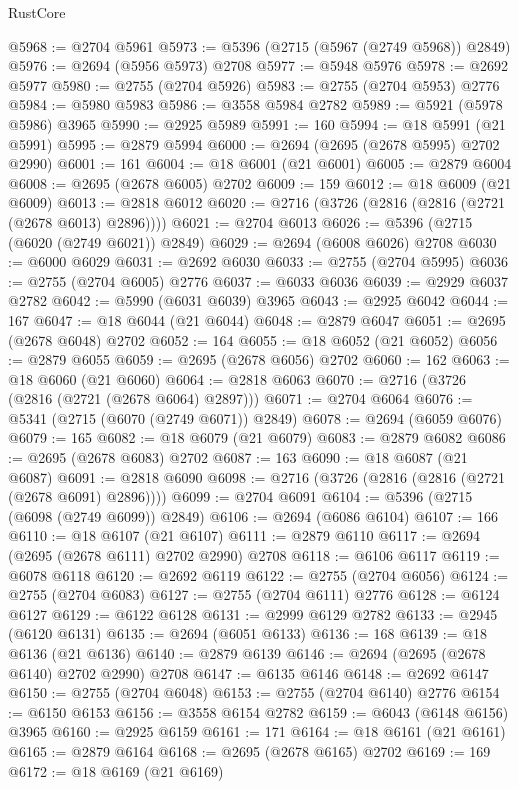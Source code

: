 \begin{lexlean}{RustCore}
\begin{coremodule}
@5968 := @2704 @5961
@5973 := @5396 (@2715 (@5967 (@2749 @5968)) @2849)
@5976 := @2694 (@5956 @5973) @2708
@5977 := @5948 @5976
@5978 := @2692 @5977
@5980 := @2755 (@2704 @5926)
@5983 := @2755 (@2704 @5953) @2776
@5984 := @5980 @5983
@5986 := @3558 @5984 @2782
@5989 := @5921 (@5978 @5986) @3965
@5990 := @2925 @5989
@5991 := 160
@5994 := @18 @5991 (@21 @5991)
@5995 := @2879 @5994
@6000 := @2694 (@2695 (@2678 @5995) @2702 @2990)
@6001 := 161
@6004 := @18 @6001 (@21 @6001)
@6005 := @2879 @6004
@6008 := @2695 (@2678 @6005) @2702
@6009 := 159
@6012 := @18 @6009 (@21 @6009)
@6013 := @2818 @6012
@6020 := @2716 (@3726 (@2816 (@2816 (@2721 (@2678 @6013) @2896))))
@6021 := @2704 @6013
@6026 := @5396 (@2715 (@6020 (@2749 @6021)) @2849)
@6029 := @2694 (@6008 @6026) @2708
@6030 := @6000 @6029
@6031 := @2692 @6030
@6033 := @2755 (@2704 @5995)
@6036 := @2755 (@2704 @6005) @2776
@6037 := @6033 @6036
@6039 := @2929 @6037 @2782
@6042 := @5990 (@6031 @6039) @3965
@6043 := @2925 @6042
@6044 := 167
@6047 := @18 @6044 (@21 @6044)
@6048 := @2879 @6047
@6051 := @2695 (@2678 @6048) @2702
@6052 := 164
@6055 := @18 @6052 (@21 @6052)
@6056 := @2879 @6055
@6059 := @2695 (@2678 @6056) @2702
@6060 := 162
@6063 := @18 @6060 (@21 @6060)
@6064 := @2818 @6063
@6070 := @2716 (@3726 (@2816 (@2721 (@2678 @6064) @2897)))
@6071 := @2704 @6064
@6076 := @5341 (@2715 (@6070 (@2749 @6071)) @2849)
@6078 := @2694 (@6059 @6076)
@6079 := 165
@6082 := @18 @6079 (@21 @6079)
@6083 := @2879 @6082
@6086 := @2695 (@2678 @6083) @2702
@6087 := 163
@6090 := @18 @6087 (@21 @6087)
@6091 := @2818 @6090
@6098 := @2716 (@3726 (@2816 (@2816 (@2721 (@2678 @6091) @2896))))
@6099 := @2704 @6091
@6104 := @5396 (@2715 (@6098 (@2749 @6099)) @2849)
@6106 := @2694 (@6086 @6104)
@6107 := 166
@6110 := @18 @6107 (@21 @6107)
@6111 := @2879 @6110
@6117 := @2694 (@2695 (@2678 @6111) @2702 @2990) @2708
@6118 := @6106 @6117
@6119 := @6078 @6118
@6120 := @2692 @6119
@6122 := @2755 (@2704 @6056)
@6124 := @2755 (@2704 @6083)
@6127 := @2755 (@2704 @6111) @2776
@6128 := @6124 @6127
@6129 := @6122 @6128
@6131 := @2999 @6129 @2782
@6133 := @2945 (@6120 @6131)
@6135 := @2694 (@6051 @6133)
@6136 := 168
@6139 := @18 @6136 (@21 @6136)
@6140 := @2879 @6139
@6146 := @2694 (@2695 (@2678 @6140) @2702 @2990) @2708
@6147 := @6135 @6146
@6148 := @2692 @6147
@6150 := @2755 (@2704 @6048)
@6153 := @2755 (@2704 @6140) @2776
@6154 := @6150 @6153
@6156 := @3558 @6154 @2782
@6159 := @6043 (@6148 @6156) @3965
@6160 := @2925 @6159
@6161 := 171
@6164 := @18 @6161 (@21 @6161)
@6165 := @2879 @6164
@6168 := @2695 (@2678 @6165) @2702
@6169 := 169
@6172 := @18 @6169 (@21 @6169)

\end{coremodule}
\end{lexlean}
